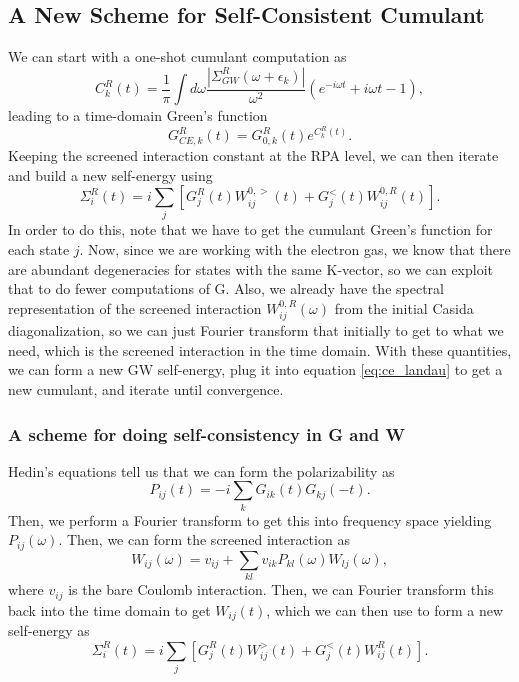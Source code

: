 \subsection{A New Scheme for Self-Consistent Cumulant}
We can start with a one-shot cumulant computation as 
\begin{equation}
    C_{k}^R(t) = \frac{1}{\pi}\int d\omega \frac{|\Sigma_{GW}^R(\omega+\epsilon_k)|}{\omega^2} \left( e^{-i\omega t} + i\omega t - 1 \right),
\label{eq:ce_landau}
\end{equation}
leading to a time-domain Green's function
\begin{equation}
     G^{R}_{CE,k}(t) = G_{0,k}^R(t) e^{C_{k}^{R}(t)}.
\end{equation}
Keeping the screened interaction constant at the RPA level, we can then iterate and build a new self-energy using 
\begin{equation}
    \Sigma_i^R(t)=i \sum_j\left[G_j^R(t) W_{i j}^{0,>}(t)+G_j^{<}(t) W_{i j}^{0, R}(t)\right] .
\end{equation}
In order to do this, note that we have to get the cumulant Green's function for each state $j$. Now, since we are working with the electron gas, we know that there are abundant degeneracies for states with the same K-vector, so we can exploit that to do fewer computations of G. Also, we already have the spectral representation of the screened interaction $W_{ij}^{0,R}(\omega)$ from the initial Casida diagonalization, so we can just Fourier transform that initially to get to what we need, which is the screened interaction in the time domain. With these quantities, we can form a new GW self-energy, plug it into equation \eqref{eq:ce_landau} to get a new cumulant, and iterate until convergence.
\subsubsection{A scheme for doing self-consistency in G and W}
Hedin's equations tell us that we can form the polarizability as 
\begin{equation}
    P_{ij}(t) = -i \sum_k G_{ik}(t) G_{kj}(-t).
\end{equation}
Then, we perform a Fourier transform to get this into frequency space yielding $P_{ij}(\omega)$. Then, we can form the screened interaction as 
\begin{equation}
    W_{ij}(\omega) = v_{ij} + \sum_{kl} v_{ik} P_{kl}(\omega) W_{lj}(\omega),
\end{equation}
where $v_{ij}$ is the bare Coulomb interaction. Then, we can Fourier transform this back into the time domain to get $W_{ij}(t)$, which we can then use to form a new self-energy as 
\begin{equation}
    \Sigma_i^R(t)=i \sum_j\left[G_j^R(t) W_{i j}^{>}(t)+G_j^{<}(t) W_{i j}^{R}(t)\right] .
\end{equation}
